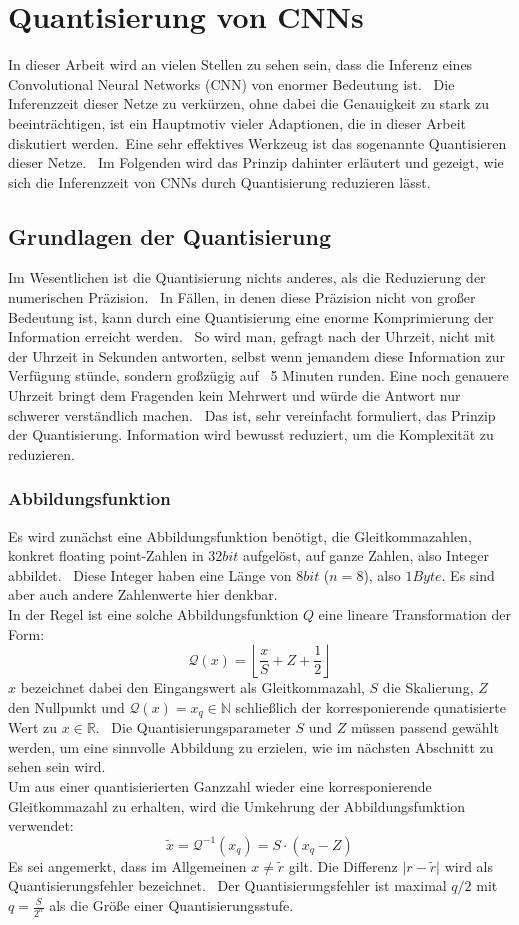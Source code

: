 \section{Quantisierung von CNNs}\label{sec:Quantisierung}
In dieser Arbeit wird an vielen Stellen zu sehen sein, dass die Inferenz eines Convolutional Neural Networks (CNN) von enormer Bedeutung ist. \
Die Inferenzzeit dieser Netze zu verkürzen, ohne dabei die Genauigkeit zu stark zu beeinträchtigen, ist ein Hauptmotiv vieler Adaptionen, die in dieser Arbeit diskutiert werden.\
Eine sehr effektives Werkzeug ist das sogenannte Quantisieren dieser Netze. \ 
Im Folgenden wird das Prinzip dahinter erläutert und gezeigt, wie sich die Inferenzzeit von CNNs durch Quantisierung reduzieren lässt. \
\subsection{Grundlagen der Quantisierung}\label{subsec:GrundlagenDerQuantisierung}
Im Wesentlichen ist die Quantisierung nichts anderes, als die Reduzierung der numerischen Präzision. \
In Fällen, in denen diese Präzision nicht von großer Bedeutung ist, kann durch eine Quantisierung eine enorme Komprimierung der Information erreicht werden. \
So wird man, gefragt nach der Uhrzeit, nicht mit der Uhrzeit in Sekunden antworten, selbst wenn jemandem diese Information zur Verfügung stünde, sondern großzügig auf \
5 Minuten runden. Eine noch genauere Uhrzeit bringt dem Fragenden kein Mehrwert und würde die Antwort nur schwerer verständlich machen. \
Das ist, sehr vereinfacht formuliert, das Prinzip der Quantisierung. Information wird bewusst reduziert, um die Komplexität zu reduzieren. \\
\subsubsection{Abbildungsfunktion}
Es wird zunächst eine Abbildungsfunktion benötigt, die Gleitkommazahlen, konkret \glqq floating point\grqq{}-Zahlen in $32 bit$ aufgelöst, auf ganze Zahlen, also \glqq Integer\grqq{} abbildet. \
Diese Integer haben eine Länge von $8 bit$ ($n=8$), also $1 Byte$. Es sind aber auch andere Zahlenwerte hier denkbar. \\
In der Regel ist eine solche Abbildungsfunktion $Q$ eine lineare Transformation der Form:
$$
\mathcal{Q}(x) =\left\lfloor \frac{x}{S} + Z + \frac{1}{2} \right\rfloor
$$
$x$ bezeichnet dabei den Eingangswert als Gleitkommazahl, $S$ die Skalierung, $Z$ den Nullpunkt und $\mathcal{Q}(x)=x_{q}\in \mathbb{N}$ schließlich der korresponierende qunatisierte Wert zu $x\in\mathbb{R}$. \
Die Quantisierungsparameter $S$ und $Z$ müssen passend gewählt werden, um eine sinnvolle Abbildung zu erzielen, wie im nächsten Abschnitt zu sehen sein wird. \\
Um aus einer quantisierierten Ganzzahl wieder eine korresponierende Gleitkommazahl zu erhalten, wird die Umkehrung der Abbildungsfunktion verwendet:
$$
\tilde{x} = \mathcal{Q}^{-1}(x_{q}) = S \cdot (x_{q} - Z)
$$
Es sei angemerkt, dass im Allgemeinen $x \neq \tilde{r}$ gilt. Die Differenz $\rvert r - \tilde{r} \rvert$ wird als Quantisierungsfehler bezeichnet. \
Der Quantisierungsfehler ist maximal $q/2$ mit $q=\frac{S}{2^{n}}$ als die Größe einer Quantisierungsstufe. \
